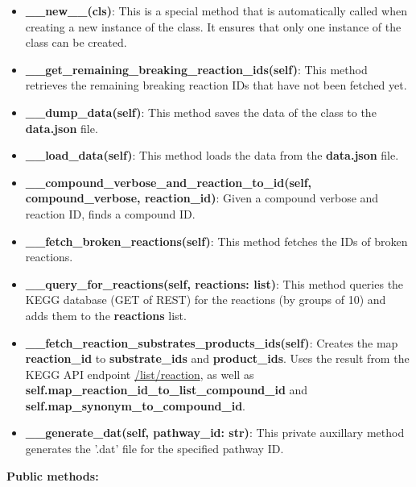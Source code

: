 \begin{itemize}
    \item \textbf{\_\_new\_\_(cls)}: This is a special method that is automatically called when creating a new instance of the class. It ensures that only one instance of the class can be created.
    \item \textbf{\_\_get\_remaining\_breaking\_reaction\_ids(self)}: This method retrieves the remaining breaking reaction IDs that have not been fetched yet.
    \item \textbf{\_\_dump\_data(self)}: This method saves the data of the class to the \textbf{data.json} file.
    \item \textbf{\_\_load\_data(self)}: This method loads the data from the \textbf{data.json} file.
    \item \textbf{\_\_compound\_verbose\_and\_reaction\_to\_id(self, compound\_verbose, reaction\_id)}: Given a compound verbose and reaction ID, finds a compound ID.
    \item \textbf{\_\_fetch\_broken\_reactions(self)}: This method fetches the IDs of broken reactions.
    \item \textbf{\_\_query\_for\_reactions(self, reactions: list)}: This method queries the KEGG database (GET of REST) for the reactions (by groups of 10) and adds them to the \textbf{reactions} list.
    \item \textbf{\_\_fetch\_reaction\_substrates\_products\_ids(self)}: Creates the map \textbf{reaction\_id} to \textbf{substrate\_ids} and \textbf{product\_ids}. Uses the result from the KEGG API endpoint \href{https://rest.kegg.jp/list/reaction}{/list/reaction}, as well as \textbf{self.map\_reaction\_id\_to\_list\_compound\_id} and \textbf{self.map\_synonym\_to\_compound\_id}.
    \item \textbf{\_\_generate\_dat(self, pathway\_id: str)}: This private auxillary method generates the '.dat' file for the specified pathway ID.
\end{itemize}

\textbf{Public methods:}

